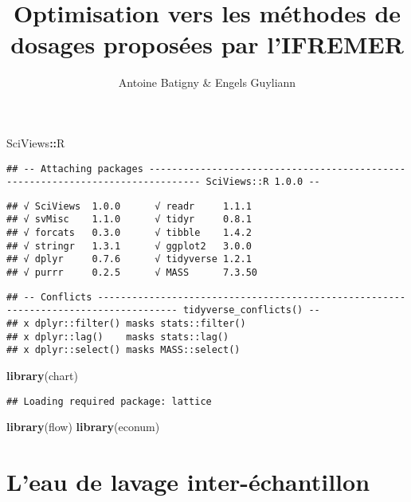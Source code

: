 \documentclass[]{article}
\title{Optimisation vers les méthodes de dosages proposées par l'IFREMER}
\author{Antoine Batigny \& Engels Guyliann}
\date{}
\newenvironment{Shaded}{\begin{snugshade}}{\end{snugshade}}
\newcommand{\KeywordTok}[1]{\textcolor[rgb]{0.13,0.29,0.53}{\textbf{#1}}}
\newcommand{\OperatorTok}[1]{\textcolor[rgb]{0.81,0.36,0.00}{\textbf{#1}}}
\newcommand{\NormalTok}[1]{#1}
\begin{document}
\maketitle

\begin{Shaded}
\begin{Highlighting}[]
\NormalTok{SciViews}\OperatorTok{::}\NormalTok{R}
\end{Highlighting}
\end{Shaded}

\begin{verbatim}
## -- Attaching packages ------------------------------------------------------------------------------- SciViews::R 1.0.0 --
\end{verbatim}

\begin{verbatim}
## √ SciViews  1.0.0      √ readr     1.1.1 
## √ svMisc    1.1.0      √ tidyr     0.8.1 
## √ forcats   0.3.0      √ tibble    1.4.2 
## √ stringr   1.3.1      √ ggplot2   3.0.0 
## √ dplyr     0.7.6      √ tidyverse 1.2.1 
## √ purrr     0.2.5      √ MASS      7.3.50
\end{verbatim}

\begin{verbatim}
## -- Conflicts ------------------------------------------------------------------------------------ tidyverse_conflicts() --
## x dplyr::filter() masks stats::filter()
## x dplyr::lag()    masks stats::lag()
## x dplyr::select() masks MASS::select()
\end{verbatim}

\begin{Shaded}
\begin{Highlighting}[]
\KeywordTok{library}\NormalTok{(chart)}
\end{Highlighting}
\end{Shaded}

\begin{verbatim}
## Loading required package: lattice
\end{verbatim}

\begin{Shaded}
\begin{Highlighting}[]
\KeywordTok{library}\NormalTok{(flow)}
\KeywordTok{library}\NormalTok{(econum)}
\end{Highlighting}
\end{Shaded}

\section{L'eau de lavage
inter-échantillon}\label{leau-de-lavage-inter-echantillon}
\end{document}
